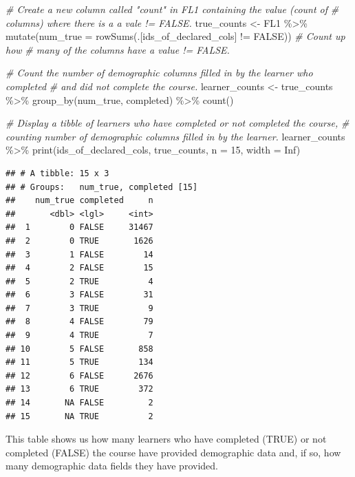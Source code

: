\documentclass[
]{article}
\newenvironment{Shaded}{\begin{snugshade}}{\end{snugshade}}
\newcommand{\AttributeTok}[1]{\textcolor[rgb]{0.77,0.63,0.00}{#1}}
\newcommand{\CommentTok}[1]{\textcolor[rgb]{0.56,0.35,0.01}{\textit{#1}}}
\newcommand{\ConstantTok}[1]{\textcolor[rgb]{0.00,0.00,0.00}{#1}}
\newcommand{\DecValTok}[1]{\textcolor[rgb]{0.00,0.00,0.81}{#1}}
\newcommand{\FunctionTok}[1]{\textcolor[rgb]{0.00,0.00,0.00}{#1}}
\newcommand{\NormalTok}[1]{#1}
\newcommand{\OtherTok}[1]{\textcolor[rgb]{0.56,0.35,0.01}{#1}}
\newcommand{\SpecialCharTok}[1]{\textcolor[rgb]{0.00,0.00,0.00}{#1}}
\begin{document}
\begin{Shaded}
\begin{Highlighting}[]
\CommentTok{\# Create a new column called "count" in FL1 containing the value (count of }
\CommentTok{\# columns) where there is a a vale != FALSE.}
\NormalTok{true\_counts }\OtherTok{\textless{}{-}}\NormalTok{ FL1 }\SpecialCharTok{\%\textgreater{}\%} 
  \FunctionTok{mutate}\NormalTok{(}\AttributeTok{num\_true =} \FunctionTok{rowSums}\NormalTok{(.[ids\_of\_declared\_cols] }\SpecialCharTok{!=} \ConstantTok{FALSE}\NormalTok{)) }\CommentTok{\# Count up how }
\CommentTok{\# many of the columns have a value != FALSE.}

\CommentTok{\# Count the number of demographic columns filled in by the learner who completed}
\CommentTok{\# and did not complete the course.}
\NormalTok{learner\_counts }\OtherTok{\textless{}{-}}\NormalTok{ true\_counts }\SpecialCharTok{\%\textgreater{}\%} 
  \FunctionTok{group\_by}\NormalTok{(num\_true, completed) }\SpecialCharTok{\%\textgreater{}\%} 
  \FunctionTok{count}\NormalTok{()}

\CommentTok{\# Display a tibble of learners who have completed or not completed the course, }
\CommentTok{\# counting number of demographic columns filled in by the learner. }
\NormalTok{learner\_counts }\SpecialCharTok{\%\textgreater{}\%}
  \FunctionTok{print}\NormalTok{(ids\_of\_declared\_cols, true\_counts, }\AttributeTok{n =} \DecValTok{15}\NormalTok{, }\AttributeTok{width =} \ConstantTok{Inf}\NormalTok{)}
\end{Highlighting}
\end{Shaded}

\begin{verbatim}
## # A tibble: 15 x 3
## # Groups:   num_true, completed [15]
##    num_true completed     n
##       <dbl> <lgl>     <int>
##  1        0 FALSE     31467
##  2        0 TRUE       1626
##  3        1 FALSE        14
##  4        2 FALSE        15
##  5        2 TRUE          4
##  6        3 FALSE        31
##  7        3 TRUE          9
##  8        4 FALSE        79
##  9        4 TRUE          7
## 10        5 FALSE       858
## 11        5 TRUE        134
## 12        6 FALSE      2676
## 13        6 TRUE        372
## 14       NA FALSE         2
## 15       NA TRUE          2
\end{verbatim}

This table shows us how many learners who have completed (TRUE) or not
completed (FALSE) the course have provided demographic data and, if so,
how many demographic data fields they have provided.
\end{document}
